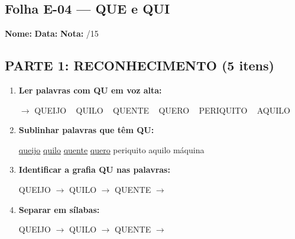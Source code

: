 \subsection{Folha E-04 --- QUE e QUI}
\begin{exercicio}



\noindent\textbf{Nome:} \underline{\hspace{3.2cm}} \quad \textbf{Data:} \underline{\hspace{1.6cm}} \quad \textbf{Nota:} \underline{\hspace{0.9cm}}/15


\subsection*{PARTE 1: RECONHECIMENTO (5 itens)}

\begin{enumerate}

  \item \textbf{Ler palavras com QU em voz alta:}
  \begin{center}
  $\rightarrow$ QUEIJO ~ QUILO ~ QUENTE ~ QUERO ~ PERIQUITO ~ AQUILO
  \end{center}

  \item \textbf{Sublinhar palavras que têm QU:}

\begin{center}
  \uline{queijo} \quad \uline{quilo} \quad \uline{quente} \quad \uline{quero} \quad periquito \quad aquilo \quad máquina
\end{center}

  \item \textbf{Identificar a grafia QU nas palavras:}
  \begin{center}
  QUEIJO $\rightarrow$ \underline{\hspace{1cm}} \quad QUILO $\rightarrow$ \underline{\hspace{1cm}} \quad QUENTE $\rightarrow$ \underline{\hspace{1cm}}
  \end{center}

  \item \textbf{Separar em sílabas:}
  \begin{center}
  QUEIJO $\rightarrow$ \underline{\hspace{1.2cm}} \quad QUILO $\rightarrow$ \underline{\hspace{1.2cm}} \quad QUENTE $\rightarrow$ \underline{\hspace{1.2cm}}
  \end{center}


\end{enumerate}
\end{exercicio}
